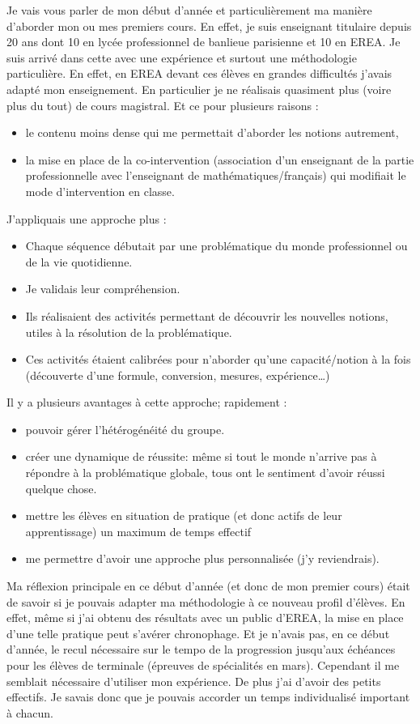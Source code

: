 \documentclass[a4paper,11pt]{article}
\begin{document}
Je vais vous parler de mon début d'année et particulièrement ma manière d'aborder mon ou mes premiers cours. En effet, je suis enseignant titulaire depuis 20 ans dont 10 en lycée professionnel de banlieue parisienne et 10 en EREA. Je suis arrivé dans cette  avec une expérience et surtout une méthodologie particulière. En effet, en EREA devant ces élèves en grandes difficultés j'avais adapté mon enseignement. En particulier je ne réalisais quasiment plus (voire plus du tout) de cours magistral. Et ce pour plusieurs raisons :
\begin{itemize}
    \item le contenu moins dense qui me permettait d'aborder les notions autrement,
    \item la mise en place de la co-intervention (association d'un enseignant de la partie professionnelle avec l'enseignant de mathématiques/français) qui modifiait le mode d'intervention en classe.
\end{itemize}
J'appliquais une approche plus :
\begin{itemize}
    \item Chaque séquence débutait par une problématique du monde professionnel ou de la vie quotidienne.
    \item Je validais leur compréhension.
    \item Ils réalisaient des activités permettant de découvrir les nouvelles notions, utiles à la résolution de la problématique.
    \item Ces activités étaient calibrées pour n'aborder qu'une capacité/notion à la fois (découverte d'une formule, conversion, mesures, expérience\dots)
\end{itemize}
Il y a plusieurs avantages à cette approche; rapidement :
\begin{itemize}
    \item pouvoir gérer l'hétérogénéité du groupe.
    \item créer une dynamique de réussite: même si tout le monde n'arrive pas à répondre à la problématique globale, tous ont le sentiment d'avoir réussi quelque chose.
    \item mettre les élèves en situation de pratique (et donc actifs de leur apprentissage) un maximum de temps effectif
    \item me permettre d'avoir une approche plus personnalisée (j'y reviendrais).
\end{itemize}
Ma réflexion principale en ce début d'année (et donc de mon premier cours) était de savoir si je pouvais adapter ma méthodologie à ce nouveau profil d'élèves. En effet, même si j'ai obtenu des résultats avec un public d'EREA, la mise en place d'une telle pratique peut s'avérer chronophage. Et je n'avais pas, en ce début d'année, le recul nécessaire  sur le tempo de la progression jusqu'aux échéances pour les élèves de terminale (épreuves de spécialités en mars). Cependant il me semblait nécessaire d'utiliser mon expérience. De plus j'ai  d'avoir des petits effectifs. Je savais donc que je pouvais accorder un temps individualisé important à chacun.\\
\end{document}
